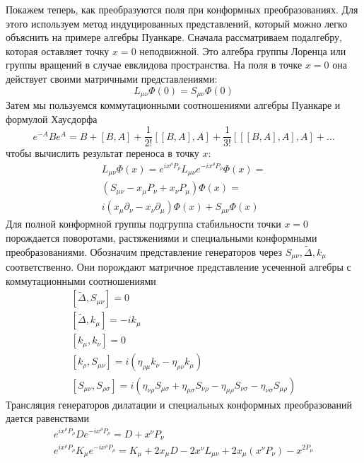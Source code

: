 \documentclass[a4paper,12pt]{article}
\theoremstyle{definition}
\theoremstyle{definition}
\theoremstyle{definition}
\begin{document}
Покажем теперь, как преобразуются поля при конформных преобразованиях. Для этого используем метод индуцированных представлений, который можно легко объяснить на примере алгебры Пуанкаре. Сначала рассматриваем подалгебру, которая оставляет точку $x=0$ неподвижной. Это алгебра группы Лоренца или группы вращений в случае евклидова пространства. На поля в точке $x=0$ она действует своими матричными представлениями:
\begin{equation}
  \label{eq:176}
  L_{\mu\nu}\Phi(0)=S_{\mu\nu}\Phi(0)
\end{equation}
Затем мы пользуемся коммутационными соотношениями алгебры Пуанкаре и формулой Хаусдорфа
\begin{equation}
  \label{eq:177}
  e^{-A}B e^{A}=B+[B,A]+\frac{1}{2!}[[B,A],A]+\frac{1}{3!}[[[B,A],A],A]+\dots
\end{equation}
чтобы вычислить результат переноса в точку $x$:
\begin{multline}
  \label{eq:178}
  L_{\mu\nu}\Phi(x)=e^{ix^{\rho}P_{\rho}}L_{\mu\nu}e^{-i x^{\rho}P_{\rho}}\Phi(x)=\\
  (S_{\mu\nu}-x_{\mu}P_{\nu}+x_{\nu}P_{\mu})\Phi(x)=\\
  i(x_{\mu}\partial_{\nu}-x_{\nu}\partial_{\mu})\Phi(x)+S_{\mu\nu}\Phi(x)
\end{multline}
Для полной конформной группы подгруппа стабильности точки $x=0$ порождается поворотами, растяжениями и специальными конформными преобразованиями. Обозначим представление генераторов через $S_{\mu\nu}, \tilde \Delta, k_{\mu}$ соответственно. Они порождают матричное представление усеченной алгебры с коммутационными соотношениями
\begin{eqnarray}
  \label{eq:179}
  \left[\tilde\Delta,S_{\mu\nu}\right]=0\\
  \left[\tilde \Delta,k_{\mu}\right]=-i k_{\mu}\\
  \left[k_{\mu},k_{\nu}\right]=0\\
  \left[k_{\rho},S_{\mu\nu}\right]=i(\eta_{\rho\mu}k_{\nu}-\eta_{\rho\nu}k_{\mu})\\
  \left[S_{\mu\nu},S_{\rho\sigma}\right]=i(\eta_{\nu\rho}S_{\mu\sigma}+\eta_{\mu\sigma}S_{\nu\rho}-\eta_{\mu\rho}S_{\nu\sigma}-\eta_{\nu\sigma}S_{\mu\rho})
\end{eqnarray}
Трансляция генераторов дилатации и специальных конформных преобразований дается равенствами
\begin{eqnarray}
  \label{eq:180}
  e^{i x^{\rho}P_{\rho}}D e^{-i x^{\rho}P_{\rho}}=D+x^{\nu}P_{\nu}\\
  e^{i x^{\rho}P_{\rho}}K_{\mu} e^{-i x^{\rho}P_{\rho}}=K_{\mu}+2x_{\mu}D -2 x^{\nu}L_{\mu\nu}+2x_{\mu}(x^{\nu}P_{\nu})-x^{2 P_{\mu}}
\end{eqnarray}
\end{document}
